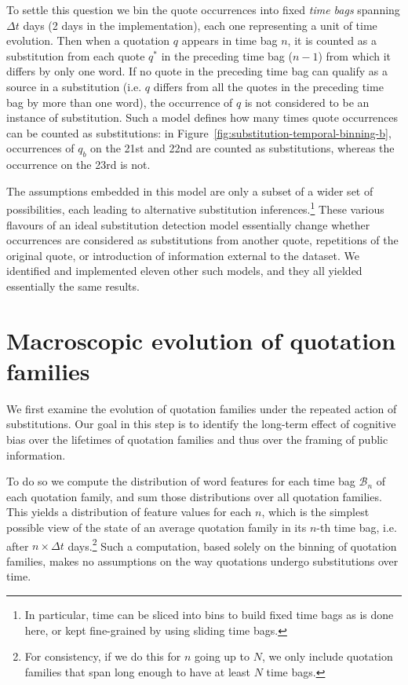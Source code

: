 To settle this question we bin the quote occurrences into fixed \emph{time bags} spanning $\Delta t$ days (2 days in the implementation), each one representing a unit of time evolution.
Then when a quotation $q$ appears in time bag $n$, it is counted as a substitution from each quote $q^*$ in the preceding time bag ($n - 1$) from which it differs by only one word.
If no quote in the preceding time bag can qualify as a source in a substitution (i.e. $q$ differs from all the quotes in the preceding time bag by more than one word), the occurrence of $q$ is not considered to be an instance of substitution.
Such a model defines how many times quote occurrences can be counted as substitutions: in Figure~\ref{fig:substitution-temporal-binning-b}, occurrences of $q_b$ on the 21st and 22nd are counted as substitutions, whereas the occurrence on the 23rd is not.

The assumptions embedded in this model are only a subset of a wider set of possibilities, each leading to alternative substitution inferences.\footnote{In particular, time can be sliced into bins to build fixed time bags as is done here, or kept fine-grained by using sliding time bags.}
These various flavours of an ideal substitution detection model essentially change whether occurrences are considered as substitutions from another quote, repetitions of the original quote, or introduction of information external to the dataset.
We identified and implemented eleven other such models, and they all yielded essentially the same results.

\section{Macroscopic evolution of quotation families}

We first examine the evolution of quotation families under the repeated action of substitutions.
Our goal in this step is to identify the long-term effect of cognitive bias over the lifetimes of quotation families and thus over the framing of public information.

To do so we compute the distribution of word features for each time bag $\mathcal{B}_n$ of each quotation family, and sum those distributions over all quotation families.
This yields a distribution of feature values for each $n$, which is the simplest possible view of the state of an average quotation family in its $n$-th time bag, i.e. after $n \times \Delta t$ days.\footnote{For consistency, if we do this for $n$ going up to $N$, we only include quotation families that span long enough to have at least $N$ time bags.}
Such a computation, based solely on the binning of quotation families, makes no assumptions on the way quotations undergo substitutions over time.

